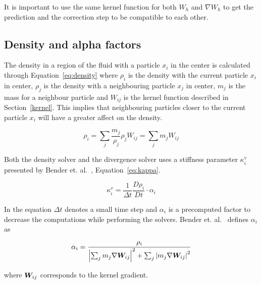     It is important to use the same kernel function for both $W_h$ and $\nabla W_h$ to get the prediction and the correction step to be compatible to each other.

\subsection{Density and alpha factors} \label{section:alpha}
    The density in a region of the fluid with a particle $x_i$ in the center is calculated through Equation~\ref{eq:density} where $\rho_i$ is the density with the current particle $x_i$ in center, $\rho_j$ is the density with a neighbouring particle $x_j$ in center, $m_j$ is the mass for a neighbour particle and $W_{ij}$ is the kernel function described in Section~\ref{kernel}.
    This implies that neighbouring particles closer to the current particle $x_i$ will have a greater affect on the density.

    \begin{equation} \label{eq:density}
        \rho_i = \sum_j \frac{m_j}{\rho_j} \rho_j W_{ij} = \sum_j m_j W_{ij}
    \end{equation} 

    Both the density solver and the divergence solver uses a stiffness parameter $\kappa_i^v$ presented by Bender et. al.~\cite{bender}, Equation~\ref{eq:kappa}.

    \begin{equation} \label{eq:kappa}
        \kappa_i^v = \frac{1}{\Delta t} \frac{D\rho_i}{Dt} \cdot \alpha_i
    \end{equation} 

    In the equation $\Delta t$ denotes a small time step and $\alpha_i$ is a precomputed factor to decrease the computations while performing the solvers.
    Bender et. al.~\cite{bender} defines $\alpha_i$ as

    \begin{equation} \label{eq:alpha}
        \alpha_i = \frac{\rho_i}{\left | \sum_j m_j \nabla \bm{W}_{ij}  \right |^2 + \sum_j \left | m_j \nabla \bm{W}_{ij} \right |^2}
    \end{equation}

    where $\bm{W}_{ij}$ corresponds to the kernel gradient.

